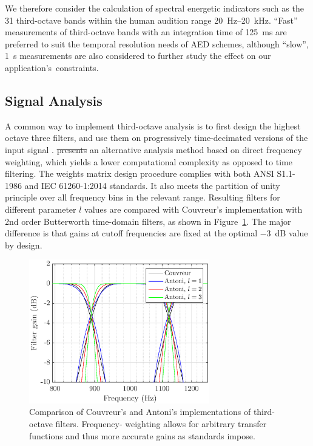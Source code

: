 \documentclass[sensors,article,accept,moreauthors,pdftex,10pt,a4paper]{mdpi}
\providecommand{\DIFaddtex}[1]{{\protect\color{blue}\uwave{#1}}} %
\providecommand{\DIFdeltex}[1]{{\protect\color{red}\sout{#1}}}                      %
\providecommand{\DIFaddbegin}{} %
\providecommand{\DIFaddend}{} %
\providecommand{\DIFdelbegin}{} %
\providecommand{\DIFdelend}{} %
\providecommand{\DIFadd}[1]{\texorpdfstring{\DIFaddtex{#1}}{#1}} %
\providecommand{\DIFdel}[1]{\texorpdfstring{\DIFdeltex{#1}}{}} %
\begin{document}
We therefore consider the calculation of spectral energetic indicators such as the 31 third-octave bands within the human audition range 20~Hz--20~kHz. ``Fast'' measurements of third-octave bands with an integration time of 125~ms are preferred to suit the temporal resolution needs of AED schemes, although ``slow'', 1~s measurements are also considered to further study the effect on our \mbox{application's constraints.}

\subsection{Signal Analysis}

A common way to implement third-octave analysis is to first design the highest octave three filters, and use them on progressively time-decimated versions of the input signal \cite{davis1986}. \DIFdelbegin %
\DIFdelend \DIFaddbegin {\DIFadd{Antoni}} \DIFaddend %
 \cite{antoni2010} \DIFdelbegin \DIFdel{presents }\DIFdelend \DIFaddbegin {\DIFadd{presents}} \DIFaddend an alternative analysis method based on direct frequency weighting, which yields a lower computational complexity as opposed to time filtering. The weights matrix design procedure complies with both ANSI S1.1-1986 \cite{citeulike:9580295} and IEC 61260-1:2014 \cite{iec-norm} standards. It also meets the partition of unity principle over all frequency bins in the relevant range. Resulting filters for different parameter $l$ values are compared with Couvreur's implementation \cite{couvreur} with 2nd order Butterworth time-domain filters, as shown in Figure~\ref{fig:freq_filt}. The major difference is that gains at cutoff frequencies are fixed at the optimal $-3$~dB value by design.
\vspace{-6pt}

\begin{figure}[H]
	\centering
		\includegraphics[width=0.7\textwidth]{figures/tob_imp.eps}
	\caption{Comparison of Couvreur's and Antoni's implementations of third-octave filters. Frequency- weighting allows for arbitrary transfer functions and thus more accurate gains {as standards impose.}}
	\label{fig:freq_filt}
\end{figure}
\end{document}
